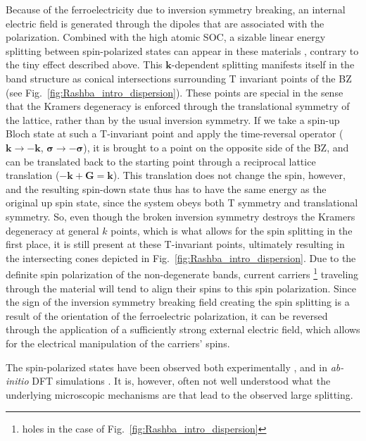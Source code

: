 Because of the ferroelectricity due to inversion symmetry breaking, an internal electric field is generated through the dipoles that are associated with the polarization.
Combined with the high atomic \gls{SOC}, a sizable linear energy splitting between spin-polarized states can appear in these materials \cite{DiSante2013}, contrary to the tiny effect described above.
This $\bm k$-dependent splitting manifests itself in the band structure as conical intersections surrounding \gls{T} invariant points of the \gls{BZ} (see Fig.~\ref{fig:Rashba_intro_dispersion}).
These points are special in the sense that the Kramers degeneracy \cite{Kramerstheorem} is enforced through the translational symmetry of the lattice, rather than by the usual inversion symmetry.
If we take a spin-up Bloch state at such a \gls{T}-invariant point and apply the time-reversal operator ($\bm k \rightarrow \bm {-k}$, $\bm{\sigma} \rightarrow -\bm{\sigma}$), it is brought to a point on the opposite side of the \gls{BZ}, and can be translated back to the starting point through a reciprocal lattice translation ($-\bm k + \bm G = \bm k$). This translation does not change the spin, however, and the resulting spin-down state thus has to have the same energy as the original up spin state, since the system obeys both \gls{T} symmetry and translational symmetry.
So, even though the broken inversion symmetry destroys the Kramers degeneracy at general $k$ points, which is what allows for the spin splitting in the first place, it is still present at these \gls{T}-invariant points, ultimately resulting in the intersecting cones depicted in Fig.~\ref{fig:Rashba_intro_dispersion}.
Due to the definite spin polarization of the non-degenerate bands, current carriers \footnote{holes in the case of Fig.~\ref{fig:Rashba_intro_dispersion}} traveling through the material will tend to align their spins to this spin polarization.
Since the sign of the inversion symmetry breaking field creating the spin splitting is a result of the orientation of the ferroelectric polarization, it can be reversed through the application of a sufficiently strong external electric field, which allows for the electrical manipulation of the carriers' spins.

The spin-polarized states have been observed both experimentally \cite{Ishizaka2011,Liebmann2016,Krempasky2015}, and in {\it ab-initio} \gls{DFT} simulations \cite{DiSante2013, Kim2014, Picozzi2014}.
It is, however, often not well understood what the underlying microscopic mechanisms are that lead to the observed large splitting.

